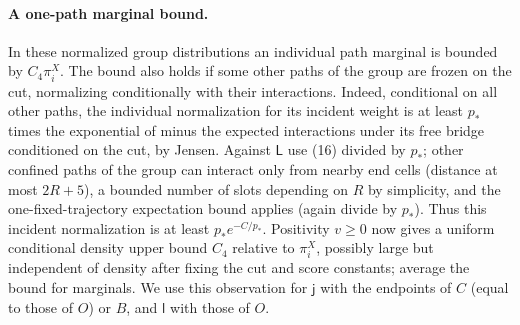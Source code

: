 \paragraph{A one-path marginal bound.}
In these normalized group distributions an individual path marginal is bounded by \(C_4\pi_i^X\). The bound also holds if some other paths of the group are frozen on the cut, normalizing conditionally with their interactions. Indeed, conditional on all other paths, the individual normalization for its incident weight is at least \(p_*\) times the exponential of minus the expected interactions under its free bridge conditioned on the cut, by Jensen. Against \(\mathsf L\) use (16) divided by \(p_*\); other confined paths of the group can interact only from nearby end cells (distance at most \(2R+5\)), a bounded number of slots depending on \(R\) by simplicity, and the one-fixed-trajectory expectation bound applies (again divide by \(p_*\)). Thus this incident normalization is at least \(p_* e^{-C/p_*}\). Positivity \(v\ge0\) now gives a uniform conditional density upper bound \(C_4\) relative to \(\pi_i^X\), possibly large but independent of density after fixing the cut and score constants; average the bound for marginals. We use this observation for \(\mathsf j\) with the endpoints of \(C\) (equal to those of \(O\)) or \(B\), and \(\mathsf l\) with those of \(O\).

